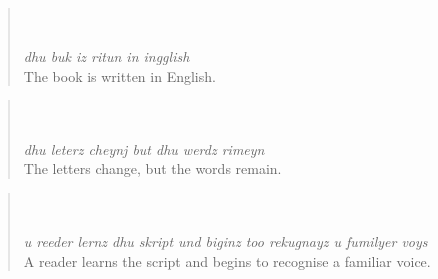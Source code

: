 \begin{quote}\noindent {}\\[2pt]
\\[1pt]
\textit{dhu buk iz ritun in ingglish}\\[1pt]
The book is written in English.
\end{quote}
\begin{quote}\noindent {}\\[2pt]
\\[1pt]
\textit{dhu leterz cheynj but dhu werdz rimeyn}\\[1pt]
The letters change, but the words remain.
\end{quote}
\begin{quote}\noindent {}\\[2pt]
\\[1pt]
\textit{u reeder lernz dhu skript und biginz too rekugnayz u fumilyer voys}\\[1pt]
A reader learns the script and begins to recognise a familiar voice.
\end{quote}